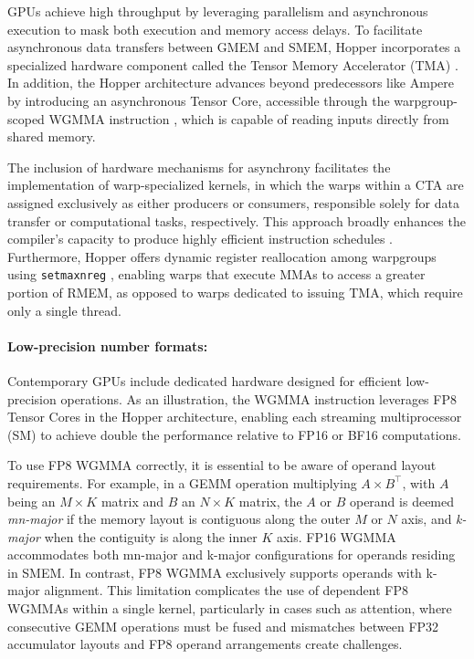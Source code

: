 GPUs achieve high throughput by leveraging parallelism and asynchronous execution to mask both execution and memory access delays. To facilitate asynchronous data transfers between GMEM and SMEM, Hopper incorporates a specialized hardware component called the Tensor Memory Accelerator (TMA) \cite[\S7.29]{cuda}. In addition, the Hopper architecture advances beyond predecessors like Ampere by introducing an asynchronous Tensor Core, accessible through the warpgroup-scoped WGMMA instruction \cite[\S9.7.14]{ptx}, which is capable of reading inputs directly from shared memory.

The inclusion of hardware mechanisms for asynchrony facilitates the implementation of warp-specialized kernels, in which the warps within a CTA are assigned exclusively as either producers or consumers, responsible solely for data transfer or computational tasks, respectively. This approach broadly enhances the compiler’s capacity to produce highly efficient instruction schedules \citep{warp-specialization-2011}. Furthermore, Hopper offers dynamic register reallocation among warpgroups using \verb|setmaxnreg| \cite[\S9.7.17.1]{ptx}, enabling warps that execute MMAs to access a greater portion of RMEM, as opposed to warps dedicated to issuing TMA, which require only a single thread.

\paragraph{Low-precision number formats:}
\label{sec:low-precision-gpu}
Contemporary GPUs include dedicated hardware designed for efficient low-precision operations. As an illustration, the WGMMA instruction leverages FP8 Tensor Cores in the Hopper architecture, enabling each streaming multiprocessor (SM) to achieve double the performance relative to FP16 or BF16 computations.

To use FP8 WGMMA correctly, it is essential to be aware of operand layout requirements. For example, in a GEMM operation multiplying $A \times B^{\top}$, with $A$ being an $M\times K$ matrix and $B$ an $N\times K$ matrix, the $A$ or $B$ operand is deemed \emph{mn-major} if the memory layout is contiguous along the outer $M$ or $N$ axis, and \emph{k-major} when the contiguity is along the inner $K$ axis. FP16 WGMMA accommodates both mn-major and k-major configurations for operands residing in SMEM. In contrast, FP8 WGMMA exclusively supports operands with k-major alignment. This limitation complicates the use of dependent FP8 WGMMAs within a single kernel, particularly in cases such as attention, where consecutive GEMM operations must be fused and mismatches between FP32 accumulator layouts and FP8 operand arrangements create challenges.

